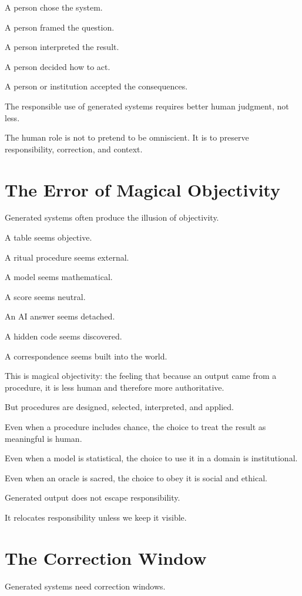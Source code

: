\documentclass[11pt]{book}
\begin{document}
A person chose the system.

A person framed the question.

A person interpreted the result.

A person decided how to act.

A person or institution accepted the consequences.

The responsible use of generated systems requires better human judgment, not less.

The human role is not to pretend to be omniscient. It is to preserve responsibility, correction, and context.

\section{The Error of Magical Objectivity}

Generated systems often produce the illusion of objectivity.

A table seems objective.

A ritual procedure seems external.

A model seems mathematical.

A score seems neutral.

An AI answer seems detached.

A hidden code seems discovered.

A correspondence seems built into the world.

This is magical objectivity: the feeling that because an output came from a procedure, it is less human and therefore more authoritative.

But procedures are designed, selected, interpreted, and applied.

Even when a procedure includes chance, the choice to treat the result as meaningful is human.

Even when a model is statistical, the choice to use it in a domain is institutional.

Even when an oracle is sacred, the choice to obey it is social and ethical.

Generated output does not escape responsibility.

It relocates responsibility unless we keep it visible.

\section{The Correction Window}

Generated systems need correction windows.
\end{document}
